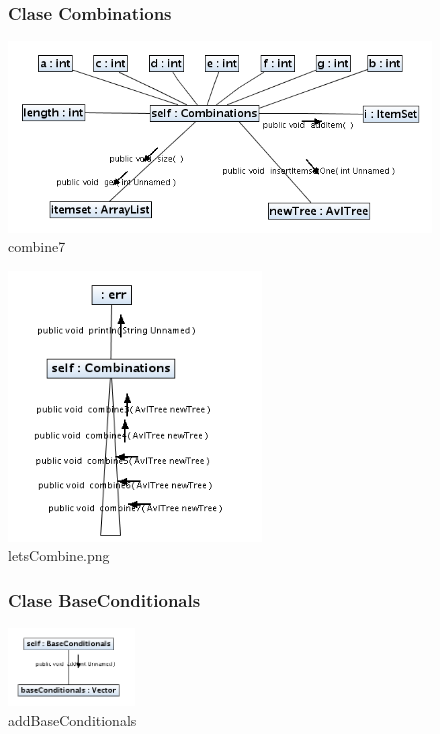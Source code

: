 \newpage
\begin{figure}
\subsubsection{Clase Combinations}
\centering
\includegraphics[width=1\textwidth]{imgsColaboracion/EuipAsso/Combinations/combine7.png}
\caption{combine7}
\end{figure}
\newpage
\begin{figure}
\centering
\includegraphics[width=0.6\textwidth]{imgsColaboracion/EuipAsso/Combinations/letsCombine.png}
\caption{letsCombine.png}
\end{figure}
\newpage
\begin{figure}
\subsubsection{Clase BaseConditionals}
\centering
\includegraphics[width=0.3\textwidth]{imgsColaboracion/FPGrowth/BaseConditionals/addBaseConditionals.png}
\caption{addBaseConditionals}
\end{figure}
